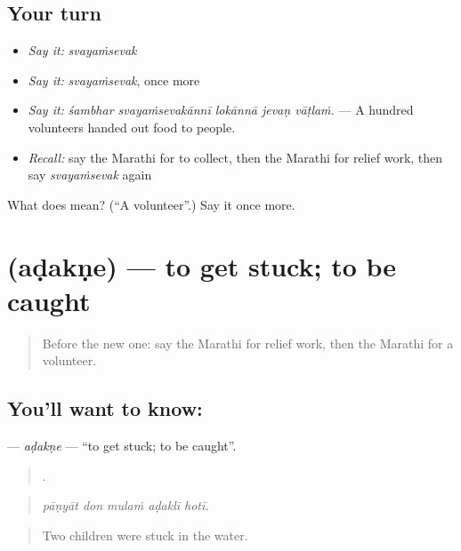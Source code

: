 \subsection*{Your turn}
\begin{itemize}
\raggedright
  \item \emph{Say it:} \emph{svayaṁsevak}
  \item \emph{Say it:} \emph{svayaṁsevak}, once more
  \item \emph{Say it:} \emph{śambhar svayaṁsevakānnī lokānnā jevaṇ vāṭlaṁ.} — A hundred volunteers handed out food to people.
  \item \emph{Recall:} say the Marathi for to collect, then the Marathi for relief work, then say \emph{svayaṁsevak} again
\end{itemize}

\begin{tcolorbox}[breakable,colback=teal!4,colframe=teal!35!black,title={Before you move on}]
What does  mean? (\textquotedblleft{}A volunteer\textquotedblright{}.) Say it once more.
\end{tcolorbox}
\section[\texorpdfstring{\mr{अडकणे} (aḍakṇe)}{अडकणे (aḍakṇe)}]{ (aḍakṇe) — to get stuck; to be caught}

\label{lesson:MR-C294-adakne}



\begin{quote}
Before the new one: say the Marathi for relief work, then the Marathi for a volunteer.
\end{quote}

\subsection*{You'll want to know: }
\textbf{} — \emph{aḍakṇe} — \textquotedblleft{}to get stuck; to be caught\textquotedblright{}.

\begin{quote}
    .
\end{quote}

\begin{quote}
\emph{pāṇyāt don mulaṁ aḍaklī hotī.}
\end{quote}

\begin{quote}
Two children were stuck in the water.
\end{quote}

